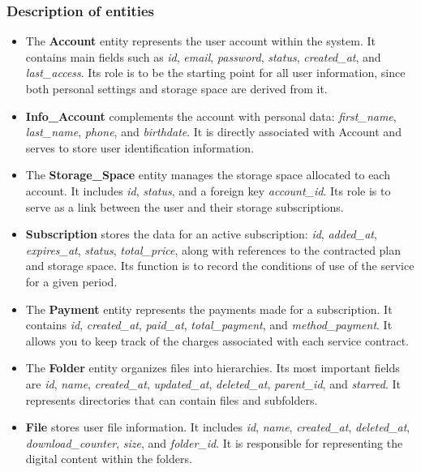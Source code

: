 \subsubsection{Description of entities}
\begin{itemize}
    \item The \textbf{Account} entity represents the user account within the system. It contains main fields such as \textit{id}, \textit{email}, \textit{password}, \textit{status}, \textit{created\_at}, and \textit{last\_access}. Its role is to be the starting point for all user information, since both personal settings and storage space are derived from it.

    \item \textbf{Info\_Account} complements the account with personal data: \textit{first\_name}, \textit{last\_name}, \textit{phone}, and \textit{birthdate}. It is directly associated with Account and serves to store user identification information.

    \item The \textbf{Storage\_Space} entity manages the storage space allocated to each account. It includes \textit{id}, \textit{status}, and a foreign key \textit{account\_id}. Its role is to serve as a link between the user and their storage subscriptions.

    \item \textbf{Subscription} stores the data for an active subscription: \textit{id}, \textit{added\_at}, \textit{expires\_at}, \textit{status}, \textit{total\_price}, along with references to the contracted plan and storage space. Its function is to record the conditions of use of the service for a given period.

    \item The \textbf{Payment} entity represents the payments made for a subscription. It contains \textit{id}, \textit{created\_at}, \textit{paid\_at}, \textit{total\_payment}, and \textit{method\_payment}. It allows you to keep track of the charges associated with each service contract.

    \item The \textbf{Folder} entity organizes files into hierarchies. Its most important fields are \textit{id}, \textit{name}, \textit{created\_at}, \textit{updated\_at}, \textit{deleted\_at}, \textit{parent\_id}, and \textit{starred}. It represents directories that can contain files and subfolders.

    \item \textbf{File} stores user file information. It includes \textit{id}, \textit{name}, \textit{created\_at}, \textit{deleted\_at}, \textit{download\_counter}, \textit{size}, and \textit{folder\_id}. It is responsible for representing the digital content within the folders.


\end{itemize}
